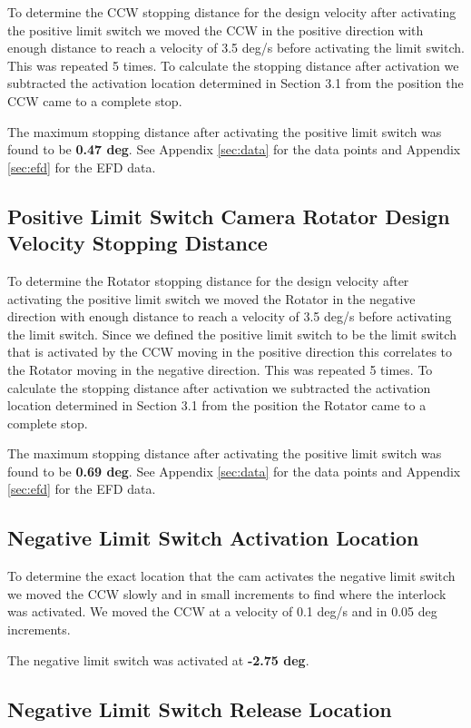 \documentclass[SE,lsstdraft,authoryear,toc]{lsstdoc}
\begin{document}
To determine the CCW stopping distance for the design velocity after
activating the positive limit switch we moved the CCW in the positive
direction with enough distance to reach a velocity of 3.5 deg/s before
activating the limit switch. This was repeated 5 times. To
calculate the stopping distance after activation we subtracted the
activation location determined in Section 3.1 from the position the CCW
came to a complete stop.

The maximum stopping distance after activating the positive limit switch
was found to be \textbf{0.47 deg}. See Appendix \ref{sec:data} for the data points
and Appendix \ref{sec:efd} for the EFD data.

\subsection{Positive Limit Switch Camera Rotator Design Velocity Stopping Distance}

To determine the Rotator stopping distance for the design velocity after
activating the positive limit switch we moved the Rotator in the
negative direction with enough distance to reach a velocity of 3.5 deg/s
before activating the limit switch. Since we defined the positive limit
switch to be the limit switch that is activated by the CCW moving in the
positive direction this correlates to the Rotator moving in the negative
direction. This was repeated 5 times. To calculate the stopping
distance after activation we subtracted the activation location
determined in Section 3.1 from the position the Rotator came to a
complete stop.

The maximum stopping distance after activating the positive limit switch
was found to be \textbf{0.69 deg}. See Appendix \ref{sec:data} for the data points
and Appendix \ref{sec:efd} for the EFD data.

\subsection{Negative Limit Switch Activation Location}

To determine the exact location that the cam activates the negative
limit switch we moved the CCW slowly and in small increments to find
where the interlock was activated. We moved the CCW at a velocity of 0.1
deg/s and in 0.05 deg increments.

The negative limit switch was activated at \textbf{-2.75 deg}.

\subsection{Negative Limit Switch Release Location}
\end{document}
